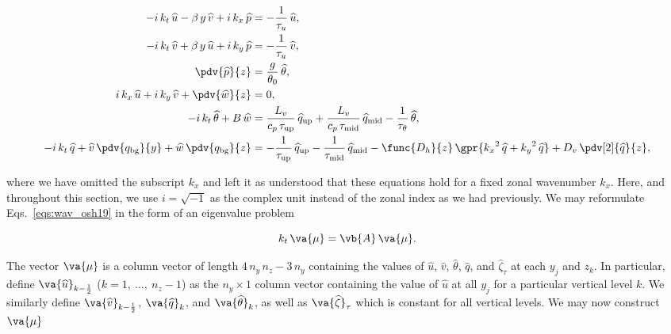 \begin{subequations}
	\begin{align}
		-i\,k_t\,\widehat{u} - \beta\,y\,\widehat{v} + i\,k_x\,\widehat{p} &= -\frac{1}{\tau_u}\,\widehat{u}, \label{eqn:wav_zonal_wind} \\
		-i\,k_t\,\widehat{v} + \beta\,y\,\widehat{u} + i\,k_y\,\widehat{p} &= -\frac{1}{\tau_u}\,\widehat{v}, \label{eqn:wav_merid_wind} \\
		\pdv{\widehat{p}}{z} &= \frac{g}{\theta_0}\,\widehat{\theta}, \label{eqn:wav_hydrostatic} \\
		i\,k_x\,\widehat{u} + i\,k_y\,\widehat{v} + \pdv{\widehat{w}}{z} &= 0, \label{eqn:lin_incomp}\\
		-i\,k_t\,\widehat{\theta} + B\,\widehat{w} &= \frac{L_v}{c_p\,\tau_{\text{up}}}\,\widehat{q}_{\text{up}} + \frac{L_v}{c_p\,\tau_{\text{mid}}}\,\widehat{q}_{\text{mid}} - \frac{1}{\tau_{\theta}}\,\widehat{\theta}, \label{eqn:wav_temp} \\
		-i\,k_t\,\widehat{q} + \widehat{v}\,\pdv{q_{\text{bg}}}{y} + \widehat{w}\,\pdv{q_{\text{bg}}}{z} &= -\frac{1}{\tau_{\text{up}}}\,\widehat{q}_{\text{up}} - \frac{1}{\tau_{\text{mid}}}\,\widehat{q}_{\text{mid}} - \func{D_h}{z}\,\gpr{{k_x}^2\,\widehat{q} + {k_y}^2\,\widehat{q}} + D_v\,\pdv[2]{\widehat{q}}{z}, \label{eqn:wav_moist}
	\end{align}
	\label{eqs:wav_osh19}
\end{subequations}

where we have omitted the subscript $k_x$ and left it as understood that these equations hold for a fixed zonal wavenumber $k_x$. Here, and throughout this section, we use $i = \sqrt{-1}$ as the complex unit instead of the zonal index as we had previously. We may reformulate Eqs.~\ref{eqs:wav_osh19} in the form of an eigenvalue problem

\begin{equation}
	k_t\,\va{\mu} = \vb{A}\,\va{\mu}.
	\label{eqn:e-val_prob}
\end{equation}

The vector $\va{\mu}$ is a column vector of length $4\,n_y\,n_z - 3\,n_y$ containing the values of $\widehat{u}$, $\widehat{v}$, $\widehat{\theta}$, $\widehat{q}$, and $\widehat{\zeta}_{\tau}$ at each $y_j$ and $z_k$. In particular, define $\va{\widehat{u}}_{k - \frac{1}{2}}$ ($k = 1,\ \dots,\ n_z - 1$) as the $n_y \times 1$ column vector containing the value of $\widehat{u}$ at all $y_j$ for a particular vertical level $k$. We similarly define $\va{\widehat{v}}_{k - \frac{1}{2}}$, $\va{\widehat{q}}_{k}$, and $\va{\widehat{\theta}}_k$, as well as $\va{\widehat{\zeta}}_\tau$ which is constant for all vertical levels. We may now construct $\va{\mu}$

